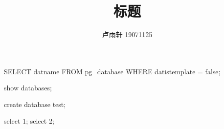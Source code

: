 \documentclass{ctexart}
\title{标题}
\author{卢雨轩 19071125}
\begin{document}
\maketitle

\begin{run}
SELECT datname FROM pg_database WHERE datistemplate = false;
\end{run}
\begin{run}
show databases;
\end{run}

\begin{run}
create database test;
\end{run}

\begin{run}
select 1;
select 2;
\end{run}
\end{document}
